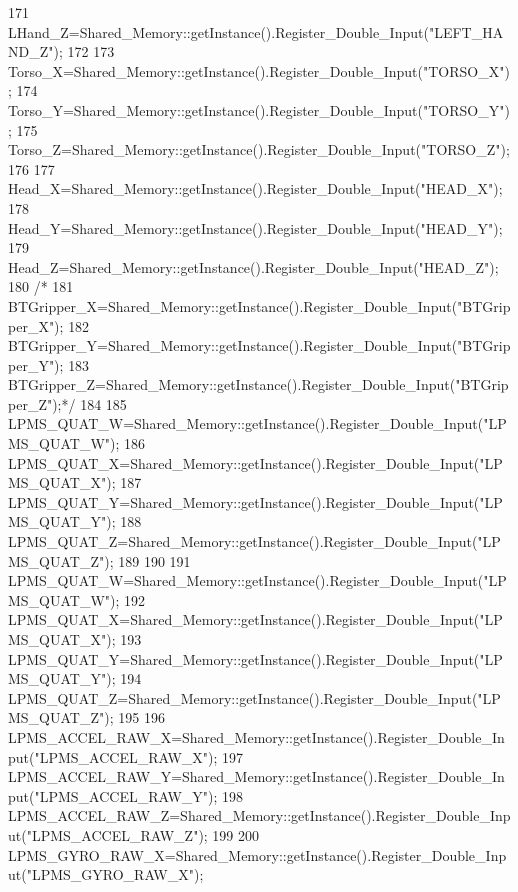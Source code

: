 \begin{DoxyCode}
171     LHand\_Z=Shared\_Memory::getInstance().Register\_Double\_Input(\textcolor{stringliteral}{"LEFT\_HAND\_Z"});
172 
173     Torso\_X=Shared\_Memory::getInstance().Register\_Double\_Input(\textcolor{stringliteral}{"TORSO\_X"});
174     Torso\_Y=Shared\_Memory::getInstance().Register\_Double\_Input(\textcolor{stringliteral}{"TORSO\_Y"});
175     Torso\_Z=Shared\_Memory::getInstance().Register\_Double\_Input(\textcolor{stringliteral}{"TORSO\_Z"});
176 
177     Head\_X=Shared\_Memory::getInstance().Register\_Double\_Input(\textcolor{stringliteral}{"HEAD\_X"});
178     Head\_Y=Shared\_Memory::getInstance().Register\_Double\_Input(\textcolor{stringliteral}{"HEAD\_Y"});
179     Head\_Z=Shared\_Memory::getInstance().Register\_Double\_Input(\textcolor{stringliteral}{"HEAD\_Z"});
180 \textcolor{comment}{/*}
181 \textcolor{comment}{    BTGripper\_X=Shared\_Memory::getInstance().Register\_Double\_Input("BTGripper\_X");
}
182 \textcolor{comment}{    BTGripper\_Y=Shared\_Memory::getInstance().Register\_Double\_Input("BTGripper\_Y");
}
183 \textcolor{comment}{    BTGripper\_Z=Shared\_Memory::getInstance().Register\_Double\_Input("BTGripper\_Z");*/}
184 
185     LPMS\_QUAT\_W=Shared\_Memory::getInstance().Register\_Double\_Input(\textcolor{stringliteral}{"LPMS\_QUAT\_W"});
186     LPMS\_QUAT\_X=Shared\_Memory::getInstance().Register\_Double\_Input(\textcolor{stringliteral}{"LPMS\_QUAT\_X"});
187     LPMS\_QUAT\_Y=Shared\_Memory::getInstance().Register\_Double\_Input(\textcolor{stringliteral}{"LPMS\_QUAT\_Y"});
188     LPMS\_QUAT\_Z=Shared\_Memory::getInstance().Register\_Double\_Input(\textcolor{stringliteral}{"LPMS\_QUAT\_Z"});
189 
190 
191     LPMS\_QUAT\_W=Shared\_Memory::getInstance().Register\_Double\_Input(\textcolor{stringliteral}{"LPMS\_QUAT\_W"});
192     LPMS\_QUAT\_X=Shared\_Memory::getInstance().Register\_Double\_Input(\textcolor{stringliteral}{"LPMS\_QUAT\_X"});
193     LPMS\_QUAT\_Y=Shared\_Memory::getInstance().Register\_Double\_Input(\textcolor{stringliteral}{"LPMS\_QUAT\_Y"});
194     LPMS\_QUAT\_Z=Shared\_Memory::getInstance().Register\_Double\_Input(\textcolor{stringliteral}{"LPMS\_QUAT\_Z"});
195 
196     LPMS\_ACCEL\_RAW\_X=Shared\_Memory::getInstance().Register\_Double\_Input(\textcolor{stringliteral}{"LPMS\_ACCEL\_RAW\_X"});
197     LPMS\_ACCEL\_RAW\_Y=Shared\_Memory::getInstance().Register\_Double\_Input(\textcolor{stringliteral}{"LPMS\_ACCEL\_RAW\_Y"});
198     LPMS\_ACCEL\_RAW\_Z=Shared\_Memory::getInstance().Register\_Double\_Input(\textcolor{stringliteral}{"LPMS\_ACCEL\_RAW\_Z"});
199 
200     LPMS\_GYRO\_RAW\_X=Shared\_Memory::getInstance().Register\_Double\_Input(\textcolor{stringliteral}{"LPMS\_GYRO\_RAW\_X"});

\end{DoxyCode}
